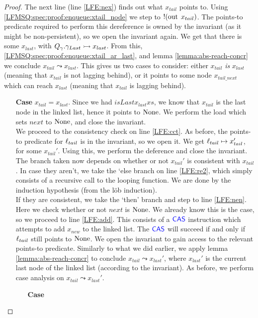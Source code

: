 \documentclass[a4paper, 11pt]{report}
\newcommand{\nOut}[1]{\operatorname{out} \; #1}
\newcommand{\Qg}{Q_\gname}
\newcommand{\reach}[2]{#1 \leadsto #2}
\newcommand{\ap}[2]{#1 \rightarrowtail #2}
\begin{document}
\begin{proof}
  The next line (line \ref{LFE:nex}) finds out what $x_{tail}$ points to. Using \ref*{LFMSQ:spec:proof:enqueue:xtail_node} we step to $\deref (\nOut{x_{tail}})$. The points-to predicate required to perform this dereference is owned by the invariant (as it might be non-persistent), so we open the invariant again. We get that there is some $x_{last}$, with $\ap{\Qg.\gname_{Last}}{x_{last}}$. From this, \ref{LFMSQ:spec:proof:enqueue:xtail_ar_last}, and lemma \ref{lemma:abs-reach-concr} we conclude $\reach{x_{tail}}{x_{last}}$. This gives us two cases to consider: either $x_{tail}$ \textit{is} $x_{last}$ (meaning that $x_{tail}$ is not lagging behind), or it points to some node $x_{tail\_next}$ which can reach $x_{last}$ (meaning that $x_{tail}$ is lagging behind).
  \begin{itemize}
    \item[\textbf{Case}]
    $x_{tail} = x_{last}$. Since we had $isLast x_{last} xs$, we know that $x_{tail}$ is the last node in the linked list, hence it points to $\operatorname{None}$. We perform the load which sets $next$ to $\operatorname{None}$, and close the invariant.\\
    We proceed to the consistency check on line \ref{LFE:cct}. As before, the points-to predicate for $\ell_{tail}$ is in the invariant, so we open it. We get $\ell_{tail} \mapsto x_{tail}'$, for some $x_{tail}'$. Using this, we perform the deference and close the invariant. The branch taken now depends on whether or not $x_{tail}'$ is consistent with $x_{tail}$. In case they aren't, we take the `else branch on line \ref{LFE:re2}, which simply consists of a recursive call to the looping function. We are done by the induction hypothesis (from the löb induction).\\
    If they are consistent, we take the `then' branch and step to line \ref{LFE:nen}. Here we check whether or not $next$ is $\operatorname{None}$. We already know this is the case, so we proceed to line \ref{LFE:add}. This consists of a $\textsf{\color{blue} CAS}$ instruction which attempts to add $x_{new}$ to the linked list. The $\textsf{\color{blue} CAS}$ will succeed if and only if $\ell_{tail}$ still points to $\operatorname{None}$. We open the invariant to gain access to the relevant points-to predicate. Similarly to what we did earlier, we apply lemma \ref{lemma:abs-reach-concr} to conclude $\reach{x_{tail}}{x_{last}'}$, where $x_{last}'$ is the current last node of the linked list (according to the invariant). As before, we perform case analysis on $\reach{x_{tail}}{x_{last}'}$.
    \begin{itemize}
      \item[\textbf{Case}]

\end{itemize}
\end{itemize}
\end{proof}
\end{document}
